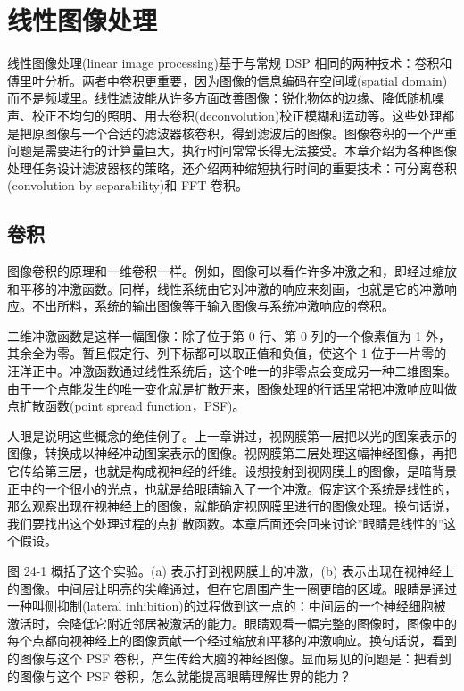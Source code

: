 
\chapter{线性图像处理}\label{ch-24}

线性图像处理(linear image processing)基于与常规 DSP
相同的两种技术：卷积和傅里叶分析。两者中卷积更重要，因为图像的信息编码在空间域(spatial
domain)而不是频域里。线性滤波能从许多方面改善图像：锐化物体的边缘、降低随机噪声、校正不均匀的照明、用去卷积(deconvolution)校正模糊和运动等。这些处理都是把原图像与一个合适的滤波器核卷积，得到滤波后的图像。图像卷积的一个严重问题是需要进行的计算量巨大，执行时间常常长得无法接受。本章介绍为各种图像处理任务设计滤波器核的策略，还介绍两种缩短执行时间的重要技术：可分离卷积(convolution
by separability)和 FFT 卷积。

\section{卷积}

图像卷积的原理和一维卷积一样。例如，图像可以看作许多冲激之和，即经过缩放和平移的冲激函数。同样，线性系统由它对冲激的响应来刻画，也就是它的冲激响应。不出所料，系统的输出图像等于输入图像与系统冲激响应的卷积。

二维冲激函数是这样一幅图像：除了位于第 0 行、第 0 列的一个像素值为 1
外，其余全为零。暂且假定行、列下标都可以取正值和负值，使这个 1
位于一片零的汪洋正中。冲激函数通过线性系统后，这个唯一的非零点会变成另一种二维图案。由于一个点能发生的唯一变化就是扩散开来，图像处理的行话里常把冲激响应叫做点扩散函数(point
spread function，PSF)。

人眼是说明这些概念的绝佳例子。上一章讲过，视网膜第一层把以光的图案表示的图像，转换成以神经冲动图案表示的图像。视网膜第二层处理这幅神经图像，再把它传给第三层，也就是构成视神经的纤维。设想投射到视网膜上的图像，是暗背景正中的一个很小的光点，也就是给眼睛输入了一个冲激。假定这个系统是线性的，那么观察出现在视神经上的图像，就能确定视网膜里进行的图像处理。换句话说，我们要找出这个处理过程的点扩散函数。本章后面还会回来讨论''眼睛是线性的''这个假设。

图 24-1 概括了这个实验。(a) 表示打到视网膜上的冲激，(b)
表示出现在视神经上的图像。中间层让明亮的尖峰通过，但在它周围产生一圈更暗的区域。眼睛是通过一种叫侧抑制(lateral
inhibition)的过程做到这一点的：中间层的一个神经细胞被激活时，会降低它附近邻居被激活的能力。眼睛观看一幅完整的图像时，图像中的每个点都向视神经上的图像贡献一个经过缩放和平移的冲激响应。换句话说，看到的图像与这个
PSF 卷积，产生传给大脑的神经图像。显而易见的问题是：把看到的图像与这个
PSF 卷积，怎么就能提高眼睛理解世界的能力？

